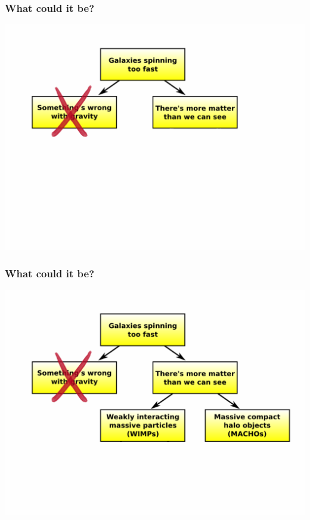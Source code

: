 \documentclass[compress]{beamer}
\begin{document}
\begin{frame}
\frametitle{What could it be?}
\begin{center}
\includegraphics[width=\linewidth]{pictures/flow_chart_1_X.png}
\end{center}
\end{frame}

\begin{frame}
\frametitle{What could it be?}
\begin{center}
\includegraphics[width=\linewidth]{pictures/flow_chart_2.png}
\end{center}
\end{frame}
\end{document}
